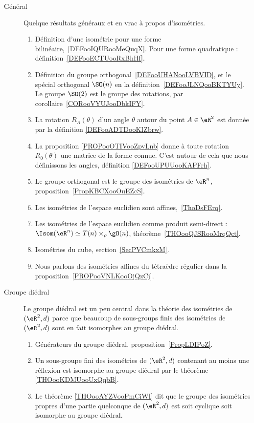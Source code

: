 \begin{description}
    \item[Général] 
        Quelque résultats généraux et en vrac à propos d'isométries.
\begin{enumerate}
    \item
        Définition d'une isométrie pour une forme bilinéaire,~\ref{DEFooIQURooMeQuqX}. Pour une forme quadratique : définition~\ref{DEFooECTUooRxBhHf}.
    \item
        Définition du groupe orthogonal~\ref{DEFooUHANooLVBVID}, et le spécial orthogonal \( \SO(n)\) en la définition~\ref{DEFooJLNQooBKTYUy}. Le groupe \( \SO(2)\) est le groupe des rotations, par corollaire~\ref{CORooVYUJooDbkIFY}.
    \item
        La rotation \( R_A(\theta)\) d'un angle \( \theta\) autour du point \( A\in \eR^2\) est donnée par la définition \ref{DEFooADTDooKIZbrw}.
    \item
        La proposition \ref{PROPooOTIVooZpvLnb} donne à toute rotation \( R_0(\theta)\) une matrice de la forme connue. C'est autour de cela que nous définissons les angles, définition \ref{DEFooUPUUooKAPFrh}.
    \item
        Le groupe orthogonal est le groupe des isométries de \( \eR^n\), proposition~\ref{PropKBCXooOuEZcS}.
    \item
        Les isométries de l'espace euclidien sont affines,~\ref{ThoDsFErq}.
    \item
        Les isométries de l'espace euclidien comme produit semi-direct : $\Isom(\eR^n)\simeq T(n)\times_{\rho}\gO(n)$, théorème~\ref{THOooQJSRooMrqQct}.
    \item
        Isométries du cube, section~\ref{SecPVCmkxM}.
    \item
        Nous parlons des isométries affines du tétraèdre régulier dans la proposition~\ref{PROPooVNLKooOjQzCj}.
\end{enumerate}

    \item[Groupe diédral]
        Le groupe diédral est un peu central dans la théorie des isométries de \( (\eR^2,d)\) parce que beaucoup de sous-groups finis des isométries de \( (\eR^2,d)\) sont en fait isomorphes au groupe diédral.
        \begin{enumerate}
    \item
        Générateurs du groupe diédral, proposition~\ref{PropLDIPoZ}.
    \item
        Un sous-groupe fini des isométries de \( (\eR^2,d)\) contenant au moins une réflexion est isomorphe au groupe diédral par le théorème \ref{THOooKDMUooUxQqbB}.
    \item
        Le théorème \ref{THOooAYZVooPmCiWI} dit que le groupe des isométries propres d'une partie quelconque de \( (\eR^2,d)\) est soit cyclique soit isomorphe au groupe diédral.
        \end{enumerate}
        

\end{description}
